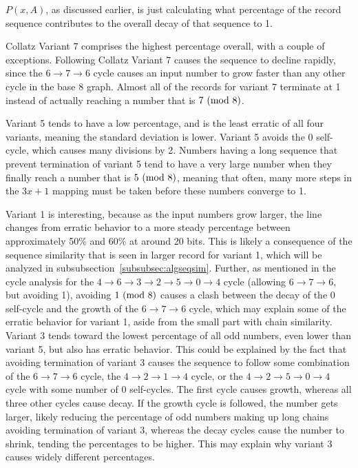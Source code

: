 $P(x,A)$, as discussed earlier, is just calculating what percentage of the record sequence contributes to the overall decay of that sequence to 1. \par
Collatz Variant 7 comprises the highest percentage overall, with a couple of exceptions. Following Collatz Variant 7 causes the sequence to decline rapidly, since the $6 \rightarrow 7 \rightarrow 6$ cycle causes an input number to grow faster than any other cycle in the base 8 graph. Almost all of the records for variant 7 terminate at 1 instead of actually reaching a number that is $7 \ (\mathrm{mod}\ 8)$. \par
Variant 5 tends to have a low percentage, and is the least erratic of all four variants, meaning the standard deviation is lower. Variant 5 avoids the 0 self-cycle, which causes many divisions by 2. Numbers having a long sequence that prevent termination of variant 5 tend to have a very large number when they finally reach a number that is $5 \ (\mathrm{mod}\ 8)$, meaning that often, many more steps in the $3x+1$ mapping must be taken before these numbers converge to 1. \par
Variant 1 is interesting, because as the input numbers grow larger, the line changes from erratic behavior to a more steady percentage between approximately 50\% and 60\% at around 20 bits. This is likely a consequence of the sequence similarity that is seen in larger record for variant 1, which will be analyzed in subsubsection~\ref{subsubsec:algseqsim}. Further, as mentioned in the cycle analysis for the $4 \rightarrow 6 \rightarrow 3 \rightarrow 2 \rightarrow 5 \rightarrow 0 \rightarrow 4$ cycle (allowing $6 \rightarrow 7 \rightarrow 6$, but avoiding 1), avoiding $1\ (\mathrm{mod}\ 8)$ causes a clash between the decay of the 0 self-cycle and the growth of the $6 \rightarrow 7 \rightarrow 6$ cycle, which may explain some of the erratic behavior for variant 1, aside from the small part with chain similarity.
Variant 3 tends toward the lowest percentage of all odd numbers, even lower than variant 5, but also has erratic behavior. This could be explained by the fact that avoiding termination of variant 3 causes the sequence to follow some combination of the $6 \rightarrow 7 \rightarrow 6$ cycle, the $4 \rightarrow 2 \rightarrow 1 \rightarrow 4$ cycle, or the $4 \rightarrow 2 \rightarrow 5 \rightarrow 0 \rightarrow 4$ cycle with some number of $0$ self-cycles. The first cycle causes growth, whereas all three other cycles cause decay. If the growth cycle is followed, the number gets larger, likely reducing the percentage of odd numbers making up long chains avoiding termination of variant 3, whereas the decay cycles cause the number to shrink, tending the percentages to be higher. This may explain why variant 3 causes widely different percentages.

